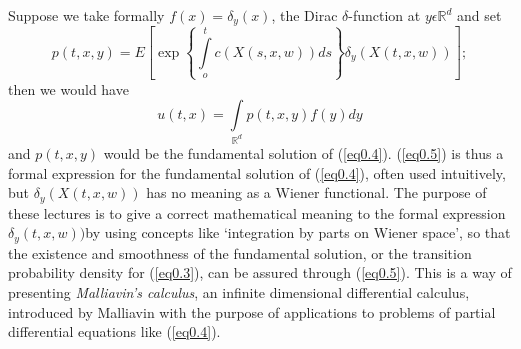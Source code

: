 Suppose we take formally $f(x) = \delta_y(x)$, the Dirac
$\delta$-function at $y \epsilon  \mathbb{R}^d$ and set  
  \begin{equation*}
    p(t,x,y)= E \left[\exp \left\{ \int\limits_o^t c
      (X(s,x,w))ds\right\} \delta_y (X(t,x,w))\right];
    \tag{0.5}\label{eq0.5}  
  \end{equation*}  
  then we would have
  $$
  u (t,x)= \int\limits_{\mathbb{R}^d} p(t,x,y)f(y) dy
  $$
and $p(t,x,y)$ would be the fundamental solution of
(\ref{eq0.4}). (\ref{eq0.5}) 
is thus a formal expression for the fundamental solution  of
(\ref{eq0.4}), often used intuitively, but $\delta_y(X(t,x,w))$ has no
meaning as a Wiener functional. The purpose of these lectures is to
give a correct mathematical meaning to the formal expression
$\delta_y(t,x,w))$\pageoriginale by 
using concepts like `integration by parts on Wiener space', so that
the existence and smoothness of the fundamental solution, or the
transition probability density for (\ref{eq0.3}), can be assured through
(\ref{eq0.5}). This is a way of presenting \textit{Malliavin's calculus}, an
infinite dimensional differential calculus, introduced by Malliavin
with the purpose of applications to problems of partial differential
equations like (\ref{eq0.4}). 

